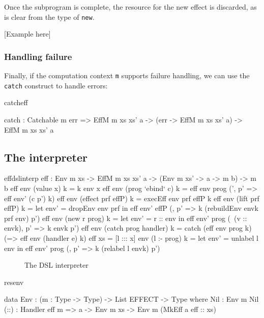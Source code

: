 \noindent
Once the subprogram is complete, the resource for the new effect is discarded,
as is clear from the type of \texttt{new}.

[Example here]

\subsubsection{Handling failure}

Finally, if the computation context \texttt{m} supports failure handling,
we can use the \texttt{catch} construct to handle errors:

\begin{SaveVerbatim}{catcheff}

catch : Catchable m err =>
        EffM m xs xs' a -> (err -> EffM m xs xs' a) ->
        EffM m xs xs' a

\end{SaveVerbatim}


\subsection{The \Eff{} interpreter}

\begin{SaveVerbatim}{effdslinterp}
eff : Env m xs -> EffM m xs xs' a -> (Env m xs' -> a -> m b) -> m b
eff env (value x) k = k env x
eff env (prog `ebind` c) k = eff env prog (\env', p' => eff env' (c p') k)
eff env (effect prf effP) k = execEff env prf effP k
eff env (lift prf effP) k = let env' = dropEnv env prf in 
                                eff env' effP (\envk, p' => k (rebuildEnv envk prf env) p')
eff env (new r prog) k = let env' = r :: env in 
                             eff env' prog (\ (v :: envk), p' => k envk p')
eff env (catch prog handler) k = catch (eff env prog k)
                                       (\e => eff env (handler e) k)
eff {xs = [l ::: x]} env (l :- prog) k = let env' = unlabel {l} env in
                                             eff env' prog (\envk, p' => k (relabel l envk) p')
\end{SaveVerbatim}

\begin{figure*}[t]
\begin{center}
\end{center}
\caption{The \Eff{} DSL interpreter}
\label{effdsltype}
\end{figure*}


\begin{SaveVerbatim}{resenv}

data Env  : (m : Type -> Type) -> 
            List EFFECT -> Type where
     Nil  : Env m Nil
     (::) : Handler eff m => 
            a -> Env m xs -> Env m (MkEff a eff :: xs)

\end{SaveVerbatim}
\label{sect:envdef}

